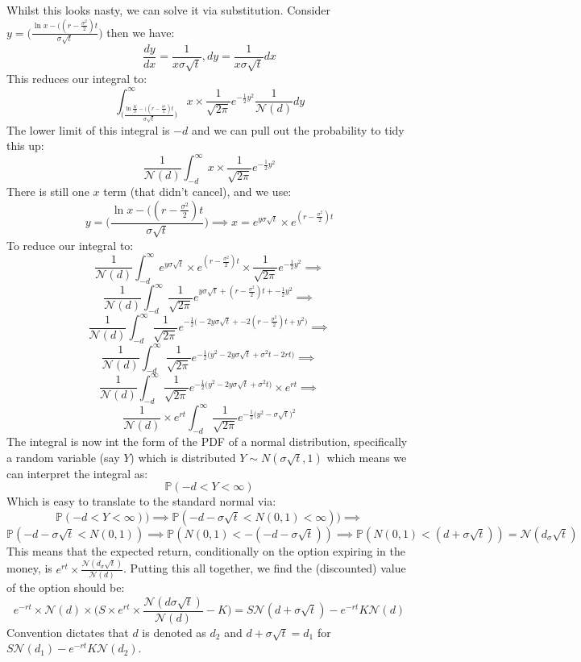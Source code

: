 \documentclass[../../Axiomathic.tex]{subfiles}
\begin{document}
Whilst this looks nasty, we can solve it via substitution. Consider $y = \biggl (\frac{\ln x - ((r-\frac{\sigma^2}{2})t}{\sigma\sqrt t}\biggr)$ then we have:
\[\frac{dy}{dx}=\frac{1}{x\sigma\sqrt t}, dy= \frac{1}{x\sigma \sqrt t}dx\]
This reduces our integral to:
\[\int_{\biggl (\frac{\ln \frac{K}{S} - ((r-\frac{\sigma^2}{2})t}{\sigma\sqrt t}\biggr)}^\infty x \times\frac{1}{\sqrt{2\pi}} e^{-\frac{1}{2}y^2} \frac{1}{\mathcal{N}(d)} dy \]
The lower limit of this integral is $-d$ and we can pull out the probability to tidy this up: 
\[\frac{1}{\mathcal{N}(d)} \int_{-d}^\infty x \times \frac{1}{\sqrt{2\pi}} e^{-\frac{1}{2}y^2}\]
There is still one $x$ term (that didn't cancel), and we use:
\[y = \biggl (\frac{\ln x - ((r-\frac{\sigma^2}{2})t}{\sigma\sqrt t}\biggr) \implies x = e^{y \sigma \sqrt{t}} \times e^{(r-\frac{\sigma^2}{2})t} \]
To reduce our integral to: 
\[\frac{1}{\mathcal{N}(d)} \int_{-d}^\infty e^{y \sigma \sqrt{t}} \times e^{(r-\frac{\sigma^2}{2})t} \times \frac{1}{\sqrt{2\pi}} e^{-\frac{1}{2}y^2} \implies\]
\[\frac{1}{\mathcal{N}(d)} \int_{-d}^\infty  \frac{1}{\sqrt{2\pi}} e^{y \sigma \sqrt{t}+(r-\frac{\sigma^2}{2})t +-\frac{1}{2}y^2} \implies\]
\[\frac{1}{\mathcal{N}(d)} \int_{-d}^\infty  \frac{1}{\sqrt{2\pi}} e^{-\frac{1}{2}\bigl ( -2y \sigma \sqrt{t}+-2(r-\frac{\sigma^2}{2})t +y^2 \bigr )} \implies\]
\[\frac{1}{\mathcal{N}(d)} \int_{-d}^\infty  \frac{1}{\sqrt{2\pi}} e^{-\frac{1}{2}\bigl (y^2  -2y \sigma \sqrt{t}+\sigma^2t-2rt \bigr )} \implies\]
\[\frac{1}{\mathcal{N}(d)} \int_{-d}^\infty  \frac{1}{\sqrt{2\pi}} e^{-\frac{1}{2}\bigl (y^2  -2y \sigma \sqrt{t}+\sigma^2t \bigr )} \times e^{rt}\implies\]
\[\frac{1}{\mathcal{N}(d)}\times e^{rt} \int_{-d}^\infty  \frac{1}{\sqrt{2\pi}} e^{-\frac{1}{2}\bigl (y^2  - \sigma \sqrt{t} \bigr )^2} \]
The integral is now int the form of the PDF of a normal distribution, specifically a random variable (say $Y$) which is distributed $Y \sim N(\sigma \sqrt t,1)$ which means we can interpret the integral as:
\[\mathbb{P}({-d} < Y<\infty)\]
Which is easy to translate to the standard normal via:
\[\mathbb{P}({-d} < Y<\infty)) \implies \mathbb{P}({-d}-\sigma \sqrt t < N(0,1) <\infty)) \implies \]
\[\mathbb{P}({-d}-\sigma \sqrt t < N(0,1)) \implies \mathbb{P}(N(0,1) <-({-d}-\sigma \sqrt t) ) \implies \mathbb{P}(N(0,1) <(d+\sigma \sqrt t) ) =\mathcal{N}(d_\sigma \sqrt t)  \]
This means that the expected return, conditionally on the option expiring in the money, is $e^{rt} \times \frac{\mathcal{N}(d_\sigma \sqrt t)}{\mathcal{N}(d)}$. Putting this all together, we find the (discounted) value of the option should be: 
\[e^{-rt} \times \mathcal{N}(d) \times \biggl (S \times e^{rt}  \times \frac{\mathcal{N}(d\sigma \sqrt t)}{\mathcal{N}(d)} - K \biggr ) =  S\mathcal{N}(d+\sigma \sqrt t) - e^{-rt}K\mathcal{N}(d)\]
Convention dictates that $d$ is denoted as $d_2$ and $d+\sigma \sqrt t = d_1$ for  $S\mathcal{N}(d_1) - e^{-rt}K\mathcal{N}(d_2)$.
\end{document}
